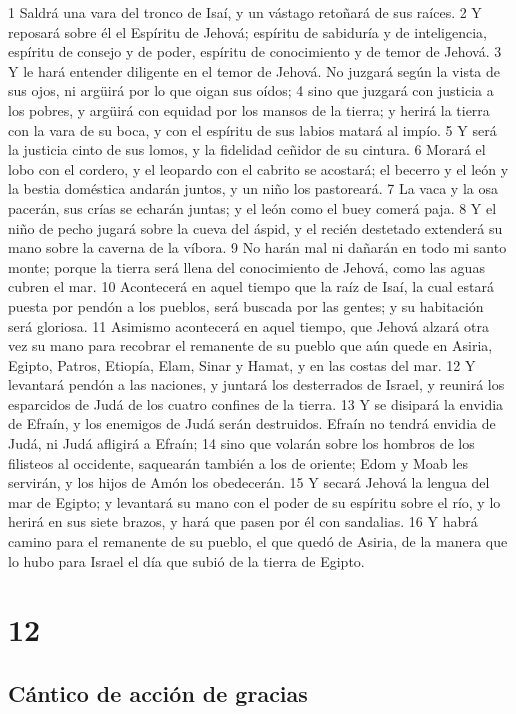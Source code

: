 1 Saldrá una vara del tronco de Isaí, y un vástago retoñará de sus raíces. 
2 Y reposará sobre él el Espíritu de Jehová; espíritu de sabiduría y de inteligencia, espíritu de consejo y de poder, espíritu de conocimiento y de temor de Jehová.
3 Y le hará entender diligente en el temor de Jehová. No juzgará según la vista de sus ojos, ni argüirá por lo que oigan sus oídos;
4 sino que juzgará con justicia a los pobres, y argüirá con equidad por los mansos de la tierra; y herirá la tierra con la vara de su boca, y con el espíritu de sus labios matará al impío. 
5 Y será la justicia cinto de sus lomos, y la fidelidad ceñidor de su cintura.
6 Morará el lobo con el cordero, y el leopardo con el cabrito se acostará; el becerro y el león y la bestia doméstica andarán juntos, y un niño los pastoreará.
7 La vaca y la osa pacerán, sus crías se echarán juntas; y el león como el buey comerá paja.
8 Y el niño de pecho jugará sobre la cueva del áspid, y el recién destetado extenderá su mano sobre la caverna de la víbora.
9 No harán mal ni dañarán en todo mi santo monte; porque la tierra será llena del conocimiento de Jehová, como las aguas cubren el mar. 
10 Acontecerá en aquel tiempo que la raíz de Isaí, la cual estará puesta por pendón a los pueblos, será buscada por las gentes; y su habitación será gloriosa.
11 Asimismo acontecerá en aquel tiempo, que Jehová alzará otra vez su mano para recobrar el remanente de su pueblo que aún quede en Asiria, Egipto, Patros, Etiopía, Elam, Sinar y Hamat, y en las costas del mar.
12 Y levantará pendón a las naciones, y juntará los desterrados de Israel, y reunirá los esparcidos de Judá de los cuatro confines de la tierra.
13 Y se disipará la envidia de Efraín, y los enemigos de Judá serán destruidos. Efraín no tendrá envidia de Judá, ni Judá afligirá a Efraín;
14 sino que volarán sobre los hombros de los filisteos al occidente, saquearán también a los de oriente; Edom y Moab les servirán, y los hijos de Amón los obedecerán.
15 Y secará Jehová la lengua del mar de Egipto; y levantará su mano con el poder de su espíritu sobre el río, y lo herirá en sus siete brazos, y hará que pasen por él con sandalias. 
16 Y habrá camino para el remanente de su pueblo, el que quedó de Asiria, de la manera que lo hubo para Israel el día que subió de la tierra de Egipto.

\chapter{12}

\section*{Cántico de acción de gracias}

